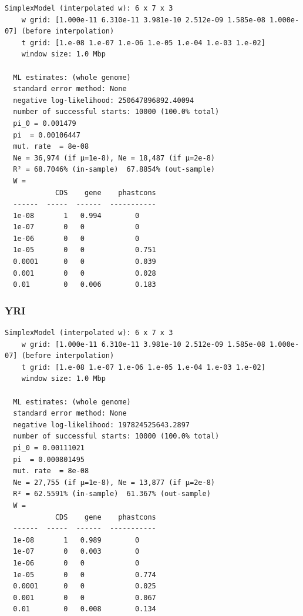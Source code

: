 \documentclass[11pt]{article}
\begin{document}
\begin{minipage}{\linewidth}\begin{footnotesize}
\begin{verbatim}
SimplexModel (interpolated w): 6 x 7 x 3
    w grid: [1.000e-11 6.310e-11 3.981e-10 2.512e-09 1.585e-08 1.000e-07] (before interpolation)
    t grid: [1.e-08 1.e-07 1.e-06 1.e-05 1.e-04 1.e-03 1.e-02]
    window size: 1.0 Mbp
  
  ML estimates: (whole genome)
  standard error method: None
  negative log-likelihood: 250647896892.40094
  number of successful starts: 10000 (100.0% total)
  pi_0 = 0.001479
  pi  = 0.00106447
  mut. rate  = 8e-08 
  Ne = 36,974 (if μ=1e-8), Ne = 18,487 (if μ=2e-8)
  R² = 68.7046% (in-sample)  67.8854% (out-sample)
  W = 
            CDS    gene    phastcons
  ------  -----  ------  -----------
  1e-08       1   0.994        0
  1e-07       0   0            0
  1e-06       0   0            0
  1e-05       0   0            0.751
  0.0001      0   0            0.039
  0.001       0   0            0.028
  0.01        0   0.006        0.183
\end{verbatim}
\end{footnotesize}\end{minipage}

\subsubsection*{YRI}

\begin{minipage}{\linewidth}\begin{footnotesize}
\begin{verbatim}
SimplexModel (interpolated w): 6 x 7 x 3
    w grid: [1.000e-11 6.310e-11 3.981e-10 2.512e-09 1.585e-08 1.000e-07] (before interpolation)
    t grid: [1.e-08 1.e-07 1.e-06 1.e-05 1.e-04 1.e-03 1.e-02]
    window size: 1.0 Mbp
  
  ML estimates: (whole genome)
  standard error method: None
  negative log-likelihood: 197824525643.2897
  number of successful starts: 10000 (100.0% total)
  pi_0 = 0.00111021
  pi  = 0.000801495
  mut. rate  = 8e-08 
  Ne = 27,755 (if μ=1e-8), Ne = 13,877 (if μ=2e-8)
  R² = 62.5591% (in-sample)  61.367% (out-sample)
  W = 
            CDS    gene    phastcons
  ------  -----  ------  -----------
  1e-08       1   0.989        0
  1e-07       0   0.003        0
  1e-06       0   0            0
  1e-05       0   0            0.774
  0.0001      0   0            0.025
  0.001       0   0            0.067
  0.01        0   0.008        0.134
\end{verbatim}
\end{footnotesize}\end{minipage}
\end{document}
